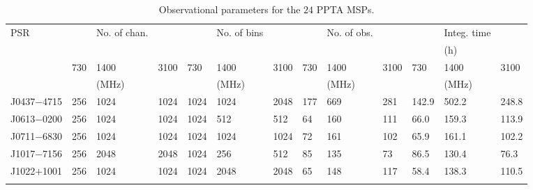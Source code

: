 \documentclass[useAMS,usenatbib]{mn2e}
\begin{document}
\begin{table}
\caption{Observational parameters for the $24$ PPTA MSPs.}
\label{obs}
\begin{center}
\begin{tabular}{p{1.7cm}p{0.8cm}<{\centering}p{1.6cm}<{\centering}p{0.8cm}<{\centering}p{0.8cm}<{\centering}p{1.5cm}<{\centering}p{0.8cm}<{\centering}p{0.8cm}<{\centering}p{1.5cm}<{\centering}p{0.8cm}<{\centering}p{0.8cm}<{\centering}p{1.5cm}<{\centering}p{0.8cm}<{\centering}}
\hline
PSR         &         & No. of chan. &          &         & No. of bins &          &         & No. of obs. &          &         & Integ. time &          \\
            &         &                 &          &         &             &          &         &             &          &         &   (h)            &       \\
        & 730 &    1400     & 3100  & 730 &  1400   & 3100 & 730 &  1400  & 3100 & 730 &  1400 & 3100\\
        &     &    (MHz)    &       &     &  (MHz)  &      &     &  (MHz) &      &     &  (MHz)&     \\
\hline
J0437$-$4715&  256    &    1024         &   1024   &  1024   &  1024       &  2048    &  177    &  669        & 281      &  142.9  &    502.2         &  248.8   \\
J0613$-$0200&  256    &    1024         &   1024   &  1024   &  512        &  512     &  64     &  160        & 111      &  66.0   &    159.3         &  113.9   \\
J0711$-$6830&  256    &    1024         &   1024   &  1024   &  1024       &  1024    &  72     &  161        & 102      &  65.9   &    161.1         &  102.2   \\
J1017$-$7156&  256    &    2048         &   2048   &  1024   &  256        &  512     &  85     &  135        & 73       &  86.5   &    130.4         &  76.3    \\
J1022$+$1001&  256    &    1024         &   1024   &  1024   &  2048       &  2048    &  65     &  148        & 117      &  58.4   &    138.3         &  110.5    \\
						&         &                 &          &         &             &          &         &             &          &         &                  &           \\

\end{tabular}
\end{center}
\end{table}
\end{document}
